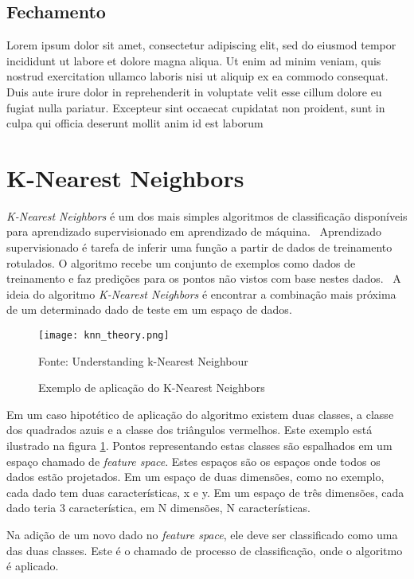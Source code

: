 \subsection{Fechamento}
\label{sec:fechamento}

Lorem ipsum dolor sit amet, consectetur adipiscing elit, sed do eiusmod tempor incididunt ut labore et dolore magna aliqua. Ut enim ad minim veniam, quis nostrud exercitation ullamco laboris nisi ut aliquip ex ea commodo consequat. Duis aute irure dolor in reprehenderit in voluptate velit esse cillum dolore eu fugiat nulla pariatur. Excepteur sint occaecat cupidatat non proident, sunt in culpa qui officia deserunt mollit anim id est laborum

\section{K-Nearest Neighbors}
\label{sec:knearest}

\emph{K-Nearest Neighbors} é um dos mais simples algoritmos de classificação disponíveis para aprendizado supervisionado em aprendizado de máquina.~\cite{opencv2014knearest} Aprendizado supervisionado é tarefa de inferir uma função a partir de dados de treinamento rotulados. O algoritmo recebe um conjunto de exemplos como dados de treinamento e faz predições para os pontos não vistos com base nestes dados.~\cite{mohri2012foundations} A ideia do algoritmo \emph{K-Nearest Neighbors} é encontrar a combinação mais próxima de um determinado dado de teste em um espaço de dados.~\cite{opencv2014knearest}

\begin{figure}[H]
	\centering
	\texttt{[image: knn\_theory.png]}
	\caption{Exemplo de aplicação do K-Nearest Neighbors}
Fonte: Understanding k-Nearest Neighbour~\cite{opencv2014knearest}
	\label{fig:knearest_example}
\end{figure}

Em um caso hipotético de aplicação do algoritmo existem duas classes, a classe dos quadrados azuis e a classe dos triângulos vermelhos. Este exemplo está ilustrado na figura \ref{fig:knearest_example}. Pontos representando estas classes são espalhados em um espaço chamado de \emph{feature space}. Estes espaços são os espaços onde todos os dados estão projetados. Em um espaço de duas dimensões, como no exemplo, cada dado tem duas características, x e y. Em um espaço de três dimensões, cada dado teria 3 característica, em N dimensões, N características.

Na adição de um novo dado no \emph{feature space}, ele deve ser classificado como uma das duas classes. Este é o chamado de processo de classificação, onde o algoritmo é aplicado.

